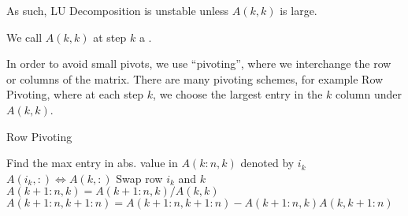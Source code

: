 \documentclass[../main/main.tex]{subfiles}
\begin{document}
  As such, LU Decomposition is unstable unless $A(k,k) $ is large.
\begin{definition}
  We call $A(k,k)$ at step $k$ a .
\end{definition}

In order to avoid small pivots, we use ``pivoting'', where we interchange the row or columns of the matrix. There are many pivoting schemes, for example Row Pivoting, where at each step $k$, we choose the largest entry in the $k$ column under $A(k,k)$.
        	\begin{algorithm}[h!]
	\caption{Row Pivoting}
	\begin{algorithmic}[1]
      \State Find the max entry in abs. value in $A(k:n,k)$ denoted by $i_{k}$
      \State $A(i_{k},:) \iff A(k,:)$
      \Comment Swap row $i_{k}$ and $k$
      \State $A(k+1:n,k)=A(k+1:n,k) / A(k,k)$
      \State $A(k+1:n,k+1:n)=A(k+1:n,k+1:n) - A(k+1:n,k)A(k,k+1:n)$
      \EndFor
	\end{algorithmic}
	\end{algorithm}
\end{document}
